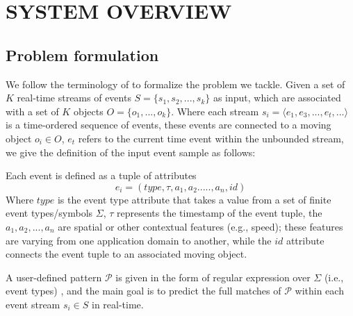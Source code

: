 \section{SYSTEM OVERVIEW}
\subsection{Problem formulation}

We follow the terminology of \cite{luckham2008power,alevizos2015complex,zhou2015pattern} to formalize the problem we tackle. Given a set of \emph{$K$} real-time streams of events $S = \{ s_1,s_2, ..., s_k\}$ as input, which are associated with a set of $K$  objects $O = \{ o_1, ..., o_k\}$. Where each stream $s_i=\langle e_1,e_3,...,e_t,...\rangle$  is a time-ordered sequence of events, these events are connected to a moving object  $o_i \in O$,  $e_t$  refers to the current time event within the unbounded stream, we give the definition of the input event sample as follows:  
\begin{definition}
	Each event is defined as a tuple of attributes $$e_i = (type,\tau,a_1,a_2.....,a_n,id)$$ Where $type$ is the event type attribute that takes a value from a set of finite event types/symbols $\Sigma$, $\tau$ represents the timestamp of the event tuple,  the  $a_1,a_2,...,a_n$ are spatial or other contextual features (e.g., speed); these features are varying from one application domain to another, while the $id$ attribute connects the event tuple to an associated moving object.
\end{definition}

A user-defined pattern $\mathcal{P}$ is given in the form of regular expression over $\Sigma$ (i.e., event types) \cite{alevizos2017event}, and the main goal is to predict the full matches of $\mathcal{P}$ within each event stream $s_i\in S$ in real-time.

